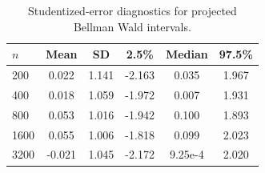 \begin{table}[t]
\centering
\small
\setlength{\tabcolsep}{5pt}
\caption{Studentized-error diagnostics for projected Bellman Wald intervals.}
\label{tab:generated-bellman-b2-studentized}
\begin{tabular}{lccccc}
\toprule
$n$ & Mean & SD & 2.5\% & Median & 97.5\% \\
\midrule
200 & 0.022 & 1.141 & -2.163 & 0.035 & 1.967 \\
400 & 0.018 & 1.059 & -1.972 & 0.007 & 1.931 \\
800 & 0.053 & 1.016 & -1.942 & 0.100 & 1.893 \\
1600 & 0.055 & 1.006 & -1.818 & 0.099 & 2.023 \\
3200 & -0.021 & 1.045 & -2.172 & 9.25e-4 & 2.020 \\
\bottomrule
\end{tabular}
\end{table}
